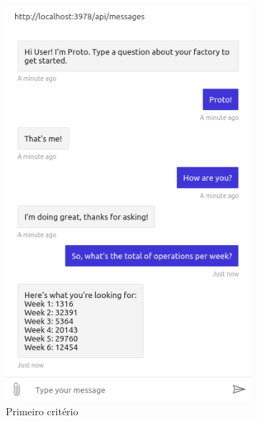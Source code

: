 \begin{figure}
\centering
    \begin{subfigure}[t]{.48\textwidth}
        \centering
        \includegraphics[width=.85\textwidth]{ch06/assets/response01.png}
        \caption{Primeiro critério}
     \end{subfigure}
     \begin{subfigure}[t]{.48\textwidth}
         \centering

\end{subfigure}
\end{figure}
